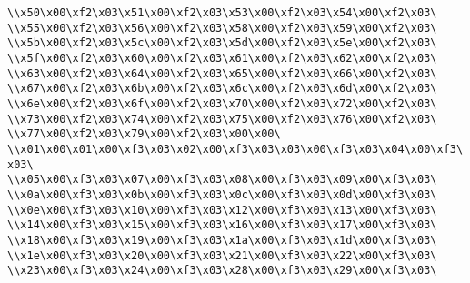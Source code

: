 \verb|\\x50\x00\xf2\x03\x51\x00\xf2\x03\x53\x00\xf2\x03\x54\x00\xf2\x03\|\newline
\verb|\\x55\x00\xf2\x03\x56\x00\xf2\x03\x58\x00\xf2\x03\x59\x00\xf2\x03\|\newline
\verb|\\x5b\x00\xf2\x03\x5c\x00\xf2\x03\x5d\x00\xf2\x03\x5e\x00\xf2\x03\|\newline
\verb|\\x5f\x00\xf2\x03\x60\x00\xf2\x03\x61\x00\xf2\x03\x62\x00\xf2\x03\|\newline
\verb|\\x63\x00\xf2\x03\x64\x00\xf2\x03\x65\x00\xf2\x03\x66\x00\xf2\x03\|\newline
\verb|\\x67\x00\xf2\x03\x6b\x00\xf2\x03\x6c\x00\xf2\x03\x6d\x00\xf2\x03\|\newline
\verb|\\x6e\x00\xf2\x03\x6f\x00\xf2\x03\x70\x00\xf2\x03\x72\x00\xf2\x03\|\newline
\verb|\\x73\x00\xf2\x03\x74\x00\xf2\x03\x75\x00\xf2\x03\x76\x00\xf2\x03\|\newline
\verb|\\x77\x00\xf2\x03\x79\x00\xf2\x03\x00\x00\|\newline
\verb|\\x01\x00\x01\x00\xf3\x03\x02\x00\xf3\x03\x03\x00\xf3\x03\x04\x00\xf3\x03\|\newline
\verb|\\x05\x00\xf3\x03\x07\x00\xf3\x03\x08\x00\xf3\x03\x09\x00\xf3\x03\|\newline
\verb|\\x0a\x00\xf3\x03\x0b\x00\xf3\x03\x0c\x00\xf3\x03\x0d\x00\xf3\x03\|\newline
\verb|\\x0e\x00\xf3\x03\x10\x00\xf3\x03\x12\x00\xf3\x03\x13\x00\xf3\x03\|\newline
\verb|\\x14\x00\xf3\x03\x15\x00\xf3\x03\x16\x00\xf3\x03\x17\x00\xf3\x03\|\newline
\verb|\\x18\x00\xf3\x03\x19\x00\xf3\x03\x1a\x00\xf3\x03\x1d\x00\xf3\x03\|\newline
\verb|\\x1e\x00\xf3\x03\x20\x00\xf3\x03\x21\x00\xf3\x03\x22\x00\xf3\x03\|\newline
\verb|\\x23\x00\xf3\x03\x24\x00\xf3\x03\x28\x00\xf3\x03\x29\x00\xf3\x03\|\newline

